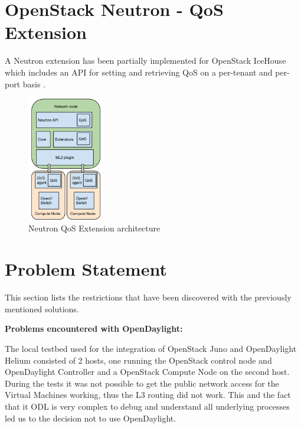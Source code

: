 \section{OpenStack Neutron - QoS Extension}

A Neutron extension has been partially implemented for OpenStack IceHouse which includes an API for setting and retrieving QoS on a per-tenant and per-port basis \cite{neutron-qos}.


\begin{figure}[H]
\centering
\includegraphics[width=0.3\textwidth]{images/sota/neutron_qos_extension.png}
\caption{Neutron QoS Extension architecture}
\end{figure}



\section{Problem Statement}

This section lists the restrictions that have been discovered with the previously mentioned solutions. 


\textbf{Problems encountered with OpenDaylight:}

The local testbed used for the integration of OpenStack Juno and OpenDaylight Helium consisted of 2 hosts, one running the OpenStack control node and OpenDaylight Controller and a OpenStack Compute Node on the second host. During the tests it was not possible to get the public network access for the Virtual Machines working, thus the L3 routing did not work. This and the fact that it ODL is very complex to debug and understand all underlying processes led us to the decision not to use OpenDaylight.


